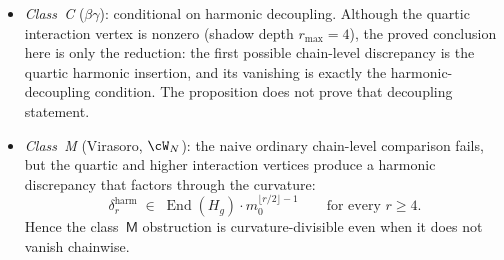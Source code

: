 \begin{proposition}
\begin{enumerate}[label=\textup{(\arabic*)},nosep]
\begin{itemize}[nosep]
 it does not by itself kill all quartic or higher brace
 components before the shadow projection. Obstruction~\textup{(3)}
 is killed at every genus only under the corresponding harmonic
 higher-brace coherence condition.
 \item \emph{Class~C}
 \textup{(}$\beta\gamma$\textup{)}:
 conditional on harmonic decoupling.
 Although the quartic interaction vertex is nonzero
 \textup{(}shadow depth $r_{\max} = 4$\textup{)},
 the proved conclusion here is only the reduction: the first
 possible chain-level discrepancy is the quartic harmonic insertion,
 and its vanishing is exactly the harmonic-decoupling condition.
 The proposition does not prove that decoupling statement.
 \item \emph{Class~M}
 \textup{(}Virasoro, $\cW_N$\textup{)}:
 the naive ordinary chain-level comparison fails, but the
 quartic and higher interaction vertices produce a harmonic
 discrepancy that factors through the curvature:
 \[
\delta_r^{\mathrm{harm}}
\;\in\;
\operatorname{End}(H_g)\cdot m_0^{\lfloor r/2 \rfloor - 1}
\qquad\text{for every } r \geq 4.
 \]
 Hence the class~$\mathsf{M}$ obstruction is curvature-divisible
 even when it does not vanish chainwise.
 \end{itemize}
\end{enumerate}
\end{proposition}

